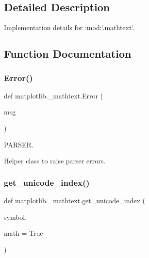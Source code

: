 \subsection{Detailed Description}
\begin{DoxyVerb}Implementation details for :mod:`.mathtext`.
\end{DoxyVerb}
 

\subsection{Function Documentation}
\mbox{\label{namespacematplotlib_1_1__mathtext_a1a53497c9c5204fef2d4475ab2493f9f}} 
\subsubsection{\texorpdfstring{Error()}{Error()}}
{\footnotesize\ttfamily def matplotlib.\+\_\+mathtext.\+Error (\begin{DoxyParamCaption}\item[{}]{msg }\end{DoxyParamCaption})}



P\+A\+R\+S\+ER. 

\begin{DoxyVerb}Helper class to raise parser errors.\end{DoxyVerb}
 \mbox{\label{namespacematplotlib_1_1__mathtext_abb90b6223775b3aa81cddd113bd774b5}} 
\subsubsection{\texorpdfstring{get\+\_\+unicode\+\_\+index()}{get\_unicode\_index()}}
{\footnotesize\ttfamily def matplotlib.\+\_\+mathtext.\+get\+\_\+unicode\+\_\+index (\begin{DoxyParamCaption}\item[{}]{symbol,  }\item[{}]{math = {\ttfamily True} }\end{DoxyParamCaption})}



